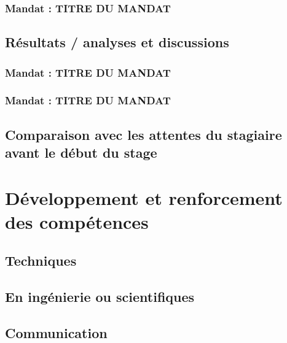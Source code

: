 \documentclass[12pt]{article} 	%
\begin{document}
\subsubsection{Mandat : TITRE DU MANDAT}

\subsection{Résultats / analyses et discussions}

\subsubsection{Mandat : TITRE DU MANDAT} 

\subsubsection{Mandat : TITRE DU MANDAT}

\subsection{Comparaison avec les attentes du stagiaire avant le début du stage}

\newpage
\section{Développement et renforcement des compétences}

\subsection{Techniques} 

\subsection{En ingénierie ou scientifiques}

\subsection{Communication}
\end{document}

